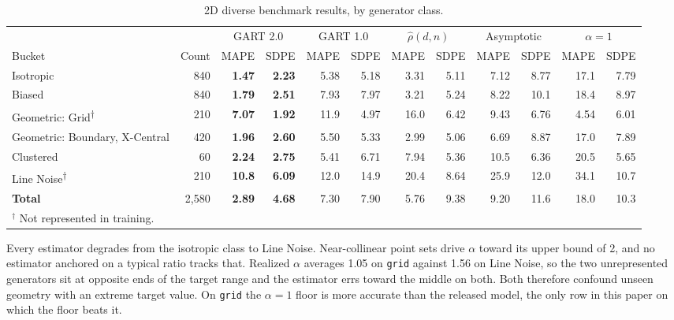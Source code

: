\documentclass{article}
\begin{document}
\begin{table}[!htbp]
\centering
\caption{2D diverse benchmark results, by generator class.}
\label{tab:results_2d}
\setlength{\tabcolsep}{4pt}
\renewcommand{\arraystretch}{1.05}
{\small%
\begin{tabular}{@{}lrrrrrrrrrrr@{}}
\toprule
 & & \multicolumn{2}{c}{GART 2.0} & \multicolumn{2}{c}{GART 1.0} & \multicolumn{2}{c}{$\hat\rho(d,n)$} & \multicolumn{2}{c}{Asymptotic} & \multicolumn{2}{c}{$\alpha=1$} \\
\cmidrule(lr){3-4}\cmidrule(lr){5-6}\cmidrule(lr){7-8}\cmidrule(lr){9-10}\cmidrule(lr){11-12}
Bucket & Count & MAPE & SDPE & MAPE & SDPE & MAPE & SDPE & MAPE & SDPE & MAPE & SDPE \\
\midrule
Isotropic & 840 & \textbf{1.47} & \textbf{2.23} & 5.38 & 5.18 & 3.31 & 5.11 & 7.12 & 8.77 & 17.1 & 7.79 \\
Biased & 840 & \textbf{1.79} & \textbf{2.51} & 7.93 & 7.97 & 3.21 & 5.24 & 8.22 & 10.1 & 18.4 & 8.97 \\
Geometric: Grid\textsuperscript{$\dagger$} & 210 & \textbf{7.07} & \textbf{1.92} & 11.9 & 4.97 & 16.0 & 6.42 & 9.43 & 6.76 & 4.54 & 6.01 \\
Geometric: Boundary, X-Central & 420 & \textbf{1.96} & \textbf{2.60} & 5.50 & 5.33 & 2.99 & 5.06 & 6.69 & 8.87 & 17.0 & 7.89 \\
Clustered & 60 & \textbf{2.24} & \textbf{2.75} & 5.41 & 6.71 & 7.94 & 5.36 & 10.5 & 6.36 & 20.5 & 5.65 \\
Line Noise\textsuperscript{$\dagger$} & 210 & \textbf{10.8} & \textbf{6.09} & 12.0 & 14.9 & 20.4 & 8.64 & 25.9 & 12.0 & 34.1 & 10.7 \\
\textbf{Total} & 2{,}580 & \textbf{2.89} & \textbf{4.68} & 7.30 & 7.90 & 5.76 & 9.38 & 9.20 & 11.6 & 18.0 & 10.3 \\
\bottomrule
\multicolumn{12}{l}{\footnotesize $^{\dagger}$ Not represented in training.} \\
\end{tabular}%
}
\end{table} 

Every estimator degrades from the isotropic class to Line Noise. Near-collinear point sets drive $\alpha$ toward its upper bound of 2, and no estimator anchored on a typical ratio tracks that. Realized $\alpha$ averages 1.05 on \texttt{grid} against 1.56 on Line Noise, so the two unrepresented generators sit at opposite ends of the target range and the estimator errs toward the middle on both. Both therefore confound unseen geometry with an extreme target value. On \texttt{grid} the $\alpha=1$ floor is more accurate than the released model, the only row in this paper on which the floor beats it.
\end{document}
